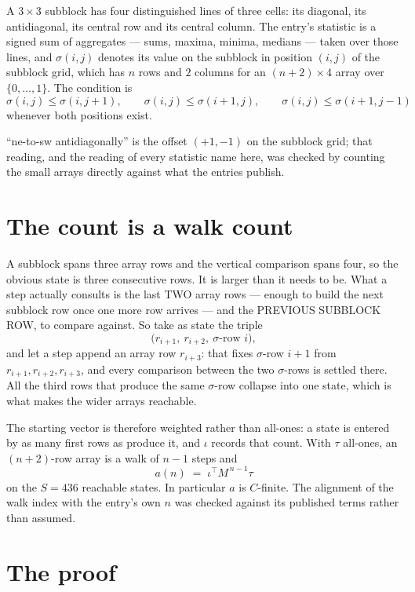 \documentclass[11pt,a4paper]{article}
\theoremstyle{plain}
\theoremstyle{definition}
\begin{document}
A $3\times3$ subblock has four distinguished lines of three cells: its diagonal, its
antidiagonal, its central row and its central column. The entry's statistic is a signed sum of
aggregates --- sums, maxima, minima, medians --- taken over those lines, and $\sigma(i,j)$
denotes its value on the subblock in position $(i,j)$ of the subblock grid, which has $n$ rows
and $2$ columns for an $(n+2)\times4$ array over $\{0,\dots,1\}$. The condition is
\[
\sigma(i,j)\le\sigma(i,j+1),\qquad \sigma(i,j)\le\sigma(i+1,j),\qquad \sigma(i,j)\le\sigma(i+1,j-1)
\]
whenever both positions exist.

``ne-to-sw antidiagonally'' is the offset $(+1,-1)$ on the subblock grid; that reading, and
the reading of every statistic name here, was checked by counting the small arrays directly
against what the entries publish.

\section{The count is a walk count}

A subblock spans three array rows and the vertical comparison spans four, so the obvious state
is three consecutive rows. It is larger than it needs to be. What a step actually consults is
the last TWO array rows --- enough to build the next subblock row once one more row arrives ---
and the PREVIOUS SUBBLOCK ROW, to compare against. So take as state the triple
\[
\bigl(r_{i+1},\ r_{i+2},\ \sigma\text{-row }i\bigr),
\]
and let a step append an array row $r_{i+3}$: that fixes $\sigma$-row $i+1$ from
$r_{i+1},r_{i+2},r_{i+3}$, and every comparison between the two $\sigma$-rows is settled
there. All the third rows that produce the same $\sigma$-row collapse into one state, which is
what makes the wider arrays reachable.

The starting vector is therefore weighted rather than all-ones: a state is entered by as many
first rows as produce it, and $\iota$ records that count. With $\tau$ all-ones, an
$(n+2)$-row array is a walk of $n-1$ steps and
\[
a(n)\;=\;\iota^{\!\top}M^{\,n-1}\tau
\]
on the $S=436$ reachable states. In particular $a$ is $C$-finite. The alignment of the walk
index with the entry's own $n$ was checked against its published terms rather than assumed.

\section{The proof}
\end{document}
